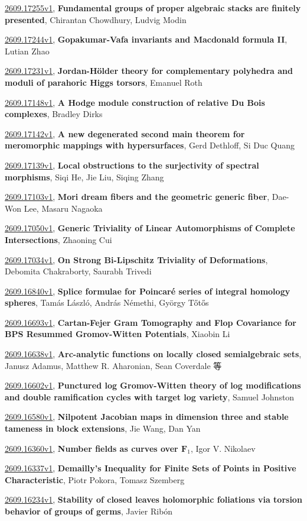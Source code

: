 \documentclass[9pt, a4paper]{article}
\theoremstyle{plain}
\theoremstyle{definition}
\theoremstyle{remark}
\newcommand{\arxiv}[3]{\href{https://arxiv.org/abs/#1}{#1}, \textbf{\textcolor{arxivblue}{#2}}, #3}
\begin{document}
\arxiv{2609.17255v1}{Fundamental groups of proper algebraic stacks are finitely presented}{Chirantan Chowdhury, Ludvig Modin}

\arxiv{2609.17244v1}{Gopakumar-Vafa invariants and Macdonald formula II}{Lutian Zhao}

\arxiv{2609.17231v1}{Jordan-Hölder theory for complementary polyhedra and moduli of parahoric Higgs torsors}{Emanuel Roth}

\arxiv{2609.17148v1}{A Hodge module construction of relative Du Bois complexes}{Bradley Dirks}

\arxiv{2609.17142v1}{A new degenerated second main theorem for meromorphic mappings with hypersurfaces}{Gerd Dethloff, Si Duc Quang}

\arxiv{2609.17139v1}{Local obstructions to the surjectivity of spectral morphisms}{Siqi He, Jie Liu, Siqing Zhang}

\arxiv{2609.17103v1}{Mori dream fibers and the geometric generic fiber}{Dae-Won Lee, Masaru Nagaoka}

\arxiv{2609.17050v1}{Generic Triviality of Linear Automorphisms of Complete Intersections}{Zhaoning Cui}

\arxiv{2609.17034v1}{On Strong Bi-Lipschitz Triviality of Deformations}{Debomita Chakraborty, Saurabh Trivedi}

\arxiv{2609.16840v1}{Splice formulae for Poincaré series of integral homology spheres}{Tamás László, András Némethi, György Tőtős}

\arxiv{2609.16693v1}{Cartan-Fejer Gram Tomography and Flop Covariance for BPS Resummed Gromov-Witten Potentials}{Xiaobin Li}

\arxiv{2609.16638v1}{Arc-analytic functions on locally closed semialgebraic sets}{Janusz Adamus, Matthew R. Aharonian, Sean Coverdale 等}

\arxiv{2609.16602v1}{Punctured log Gromov-Witten theory of log modifications and double ramification cycles with target log variety}{Samuel Johnston}

\arxiv{2609.16580v1}{Nilpotent Jacobian maps in dimension three and stable tameness in block extensions}{Jie Wang, Dan Yan}

\arxiv{2609.16360v1}{Number fields as curves over $\mathbf{F}_1$}{Igor V. Nikolaev}

\arxiv{2609.16337v1}{Demailly's Inequality for Finite Sets of Points in Positive Characteristic}{Piotr Pokora, Tomasz Szemberg}

\arxiv{2609.16234v1}{Stability of closed leaves holomorphic foliations via torsion behavior of groups of germs}{Javier Ribón}
\end{document}
